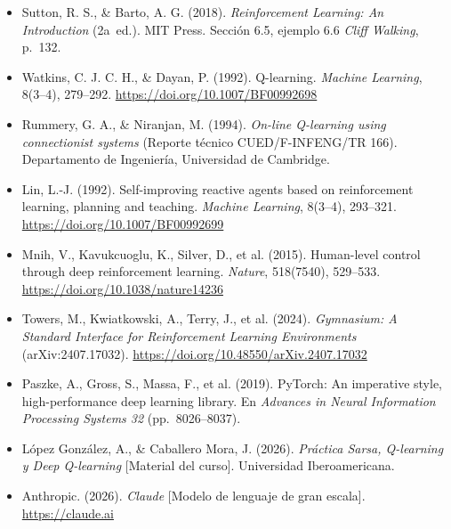 \documentclass[11pt]{article}
\begin{document}
\begin{itemize}
    \item Sutton, R. S., \& Barto, A. G. (2018). \emph{Reinforcement Learning: An
    Introduction} (2a~ed.). MIT Press. Sección 6.5, ejemplo 6.6 \emph{Cliff
    Walking}, p.~132.
    \item Watkins, C. J. C. H., \& Dayan, P. (1992). Q-learning. \emph{Machine
    Learning}, 8(3--4), 279--292. \url{https://doi.org/10.1007/BF00992698}
    \item Rummery, G. A., \& Niranjan, M. (1994). \emph{On-line Q-learning using
    connectionist systems} (Reporte técnico CUED/F-INFENG/TR 166). Departamento
    de Ingeniería, Universidad de Cambridge.
    \item Lin, L.-J. (1992). Self-improving reactive agents based on reinforcement
    learning, planning and teaching. \emph{Machine Learning}, 8(3--4), 293--321.
    \url{https://doi.org/10.1007/BF00992699}
    \item Mnih, V., Kavukcuoglu, K., Silver, D., et al. (2015). Human-level control
    through deep reinforcement learning. \emph{Nature}, 518(7540), 529--533.
    \url{https://doi.org/10.1038/nature14236}
    \item Towers, M., Kwiatkowski, A., Terry, J., et al. (2024). \emph{Gymnasium:
    A Standard Interface for Reinforcement Learning Environments}
    (arXiv:2407.17032). \url{https://doi.org/10.48550/arXiv.2407.17032}
    \item Paszke, A., Gross, S., Massa, F., et al. (2019). PyTorch: An imperative
    style, high-performance deep learning library. En \emph{Advances in Neural
    Information Processing Systems 32} (pp.~8026--8037).
    \item López González, A., \& Caballero Mora, J. (2026). \emph{Práctica Sarsa,
    Q-learning y Deep Q-learning} [Material del curso]. Universidad
    Iberoamericana.
    \item Anthropic. (2026). \emph{Claude} [Modelo de lenguaje de gran escala].
    \url{https://claude.ai}
\end{itemize}
\end{document}
